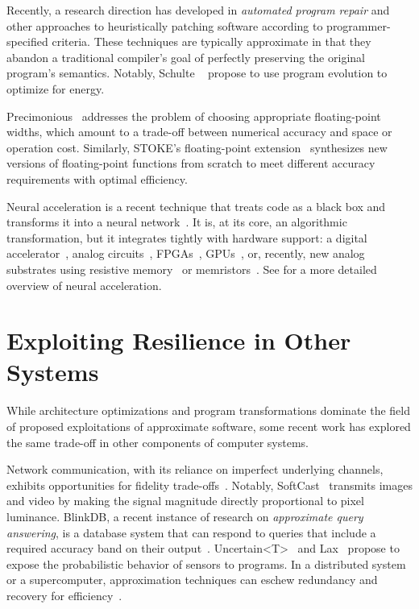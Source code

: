 Recently, a research direction has developed in \emph{automated program
repair} and other approaches to heuristically patching software according to
programmer-specified criteria.
These techniques are typically approximate in that they abandon a traditional
compiler's goal of perfectly preserving the original program's semantics.
Notably, Schulte \etal~\cite{schulte} propose to use program evolution to
optimize for energy.

Precimonious~\cite{precimonious} addresses the problem of choosing appropriate
floating-point widths, which amount to a trade-off between numerical accuracy
and space or operation cost.
Similarly, STOKE's floating-point extension~\cite{stoke-fp} synthesizes new
versions of floating-point functions from scratch to meet different accuracy
requirements with optimal efficiency.

Neural acceleration is a recent technique that treats code as a black box and
transforms it into a neural network~\cite{npu, emeuro, benchnn,
temam-isca}.
It is, at its core, an algorithmic transformation, but it integrates tightly
with hardware support: a digital accelerator~\cite{npu}, analog
circuits~\cite{anpu}, FPGAs~\cite{snnap},
GPUs~\cite{neuralgpu}, or, recently, new analog substrates using
resistive memory~\cite{rram-npu} or memristors~\cite{memristor-npu}.
See  for a more detailed overview of neural acceleration.


\section{Exploiting Resilience in Other Systems}

While architecture optimizations and program transformations dominate the
field of proposed exploitations of approximate software, some recent work has
explored the same trade-off in other components of computer systems.

Network
communication, with its reliance on imperfect underlying channels, exhibits
opportunities for fidelity trade-offs~\cite{softcast, luo-globecom, apex,
smpmup2006}. Notably, SoftCast~\cite{softcast} transmits images and video by
making the signal magnitude directly proportional to pixel luminance.
%
BlinkDB,
a recent instance of research on \emph{approximate query answering},
is a database system that can respond to queries that include a required
accuracy band on their output~\cite{blinkdb}.
%
Uncertain{\textless}T{\textgreater}~\cite{uncertaint} and Lax~\cite{lax}
propose to expose the probabilistic behavior of sensors to
programs.
%
In a distributed system or a supercomputer, approximation techniques can
eschew redundancy and recovery for efficiency~\cite{dekruijf-icpp}.


